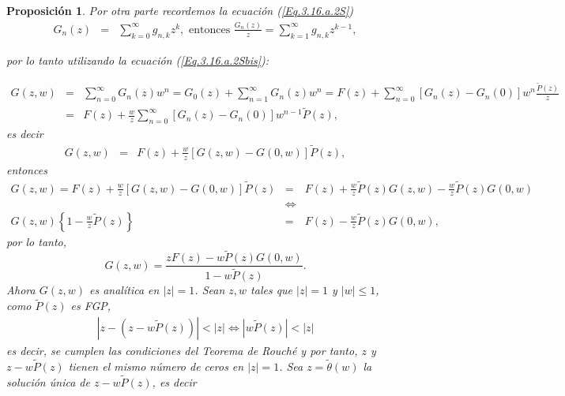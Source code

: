 \documentclass{article}
\newtheorem{Prop}{Proposición}[section]
\numberwithin{equation}{section}
\begin{document}
\begin{Prop}
Por otra parte recordemos la ecuaci\'on (\ref{Eq.3.16.a.2S})
\begin{eqnarray*}
G_{n}\left(z\right)&=&\sum_{k=0}^{\infty}g_{n,k}z^{k},\textrm{ entonces }\frac{G_{n}\left(z\right)}{z}=\sum_{k=1}^{\infty}g_{n,k}z^{k-1},
\end{eqnarray*}

por lo tanto utilizando la ecuaci\'on (\ref{Eq.3.16.a.2Sbis}):

\begin{eqnarray*}
G\left(z,w\right)&=&\sum_{n=0}^{\infty}G_{n}\left(z\right)w^{n}=G_{0}\left(z\right)+\sum_{n=1}^{\infty}G_{n}\left(z\right)w^{n}=F\left(z\right)+\sum_{n=0}^{\infty}\left[G_{n}\left(z\right)-G_{n}\left(0\right)\right]w^{n}\frac{\tilde{P}\left(z\right)}{z}\\
&=&F\left(z\right)+\frac{w}{z}\sum_{n=0}^{\infty}\left[G_{n}\left(z\right)-G_{n}\left(0\right)\right]w^{n-1}\tilde{P}\left(z\right),
\end{eqnarray*}
es decir
\begin{eqnarray*}
G\left(z,w\right)&=&F\left(z\right)+\frac{w}{z}\left[G\left(z,w\right)-G\left(0,w\right)\right]\tilde{P}\left(z\right),
\end{eqnarray*}
entonces
\begin{eqnarray*}
G\left(z,w\right)=F\left(z\right)+\frac{w}{z}\left[G\left(z,w\right)-G\left(0,w\right)\right]\tilde{P}\left(z\right)&=&F\left(z\right)+\frac{w}{z}\tilde{P}\left(z\right)G\left(z,w\right)-\frac{w}{z}\tilde{P}\left(z\right)G\left(0,w\right)\\
&\Leftrightarrow&\\
G\left(z,w\right)\left\{1-\frac{w}{z}\tilde{P}\left(z\right)\right\}&=&F\left(z\right)-\frac{w}{z}\tilde{P}\left(z\right)G\left(0,w\right),
\end{eqnarray*}
por lo tanto,
\begin{equation}
G\left(z,w\right)=\frac{zF\left(z\right)-w\tilde{P}\left(z\right)G\left(0,w\right)}{1-w\tilde{P}\left(z\right)}.
\end{equation}
Ahora $G\left(z,w\right)$ es anal\'itica en $|z|=1$. Sean $z,w$ tales que $|z|=1$ y $|w|\leq1$, como $\tilde{P}\left(z\right)$ es FGP,
\begin{eqnarray*}
|z-\left(z-w\tilde{P}\left(z\right)\right)|<|z|\Leftrightarrow|w\tilde{P}\left(z\right)|<|z|
\end{eqnarray*}
es decir, se cumplen las condiciones del Teorema de Rouch\'e y por tanto, $z$ y $z-w\tilde{P}\left(z\right)$ tienen el mismo n\'umero de ceros en $|z|=1$. Sea $z=\tilde{\theta}\left(w\right)$ la soluci\'on \'unica de $z-w\tilde{P}\left(z\right)$, es decir

\end{Prop}
\end{document}
